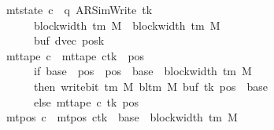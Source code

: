 \begin{isabellebody}
\ \ \ \ \ \ \ \ \ \ \ \ \ \ {\isasymand}\ mt{\isacharunderscore}{\kern0pt}state\ c{}\ {\isacharequal}{\kern0pt}\ {\isacharparenleft}{\kern0pt}q{\isacharcomma}{\kern0pt}\ AR{\isacharunderscore}{\kern0pt}SimWrite{\isacharcomma}{\kern0pt}\ tk{\isacharcomma}{\kern0pt}\isanewline
\ \ \ \ \ \ \ \ \ \ \ \ \ \ \ \ \ \ \ \ block{\isacharunderscore}{\kern0pt}width\ {\isacharparenleft}{\kern0pt}{\isasymGamma}{\isacharunderscore}{\kern0pt}tm\ M{\isacharparenright}{\kern0pt}\ {\isacharplus}{\kern0pt}\ {\isacharparenleft}{\kern0pt}block{\isacharunderscore}{\kern0pt}width\ {\isacharparenleft}{\kern0pt}{\isasymGamma}{\isacharunderscore}{\kern0pt}tm\ M{\isacharparenright}{\kern0pt}\ {\isacharminus}{\kern0pt}\ {}{\isacharparenright}{\kern0pt}{\isacharcomma}{\kern0pt}\isanewline
\ \ \ \ \ \ \ \ \ \ \ \ \ \ \ \ \ \ \ \ buf{\isacharcomma}{\kern0pt}\ dvec{\isacharcomma}{\kern0pt}\ posk{\isacharparenright}{\kern0pt}\isanewline
\ \ \ \ \ \ \ \ \ \ \ \ \ \ {\isasymand}\ mt{\isacharunderscore}{\kern0pt}tape\ c{}\ {\isacharequal}{\kern0pt}\ {\isacharparenleft}{\kern0pt}mt{\isacharunderscore}{\kern0pt}tape\ c{\isacharprime}{\kern0pt}{\isacharparenright}{\kern0pt}{\isacharparenleft}{\kern0pt}tk\ {\isacharcolon}{\kern0pt}{\isacharequal}{\kern0pt}\ {\isacharparenleft}{\kern0pt}{\isasymlambda}pos{\isachardot}{\kern0pt}\isanewline
\ \ \ \ \ \ \ \ \ \ \ \ \ \ \ \ \ \ \ \ if\ base\ {\isasymle}\ pos\ {\isasymand}\ pos\ {\isacharless}{\kern0pt}\ base\ {\isacharplus}{\kern0pt}\ {\isacharparenleft}{\kern0pt}block{\isacharunderscore}{\kern0pt}width\ {\isacharparenleft}{\kern0pt}{\isasymGamma}{\isacharunderscore}{\kern0pt}tm\ M{\isacharparenright}{\kern0pt}\ {\isacharminus}{\kern0pt}\ {}{\isacharparenright}{\kern0pt}\isanewline
\ \ \ \ \ \ \ \ \ \ \ \ \ \ \ \ \ \ \ \ then\ write{\isacharunderscore}{\kern0pt}bit\ {\isacharparenleft}{\kern0pt}{\isasymGamma}{\isacharunderscore}{\kern0pt}tm\ M{\isacharparenright}{\kern0pt}\ {\isacharparenleft}{\kern0pt}bl{\isacharunderscore}{\kern0pt}tm\ M{\isacharparenright}{\kern0pt}\ {\isacharparenleft}{\kern0pt}buf\ tk{\isacharparenright}{\kern0pt}\ {\isacharparenleft}{\kern0pt}pos\ {\isacharminus}{\kern0pt}\ base{\isacharparenright}{\kern0pt}\isanewline
\ \ \ \ \ \ \ \ \ \ \ \ \ \ \ \ \ \ \ \ else\ mt{\isacharunderscore}{\kern0pt}tape\ c{\isacharprime}{\kern0pt}\ tk\ pos{\isacharparenright}{\kern0pt}{\isacharparenright}{\kern0pt}\isanewline
\ \ \ \ \ \ \ \ \ \ \ \ \ \ {\isasymand}\ mt{\isacharunderscore}{\kern0pt}pos\ c{}\ {\isacharequal}{\kern0pt}\ {\isacharparenleft}{\kern0pt}mt{\isacharunderscore}{\kern0pt}pos\ c{\isacharprime}{\kern0pt}{\isacharparenright}{\kern0pt}{\isacharparenleft}{\kern0pt}tk\ {\isacharcolon}{\kern0pt}{\isacharequal}{\kern0pt}\ base\ {\isacharplus}{\kern0pt}\ {\isacharparenleft}{\kern0pt}block{\isacharunderscore}{\kern0pt}width\ {\isacharparenleft}{\kern0pt}{\isasymGamma}{\isacharunderscore}{\kern0pt}tm\ M{\isacharparenright}{\kern0pt}\ {\isacharminus}{\kern0pt}\ {}{\isacharparenright}{\kern0pt}{\isacharparenright}{\kern0pt}{\isachardoublequoteclose}\isanewline

\end{isabellebody}
